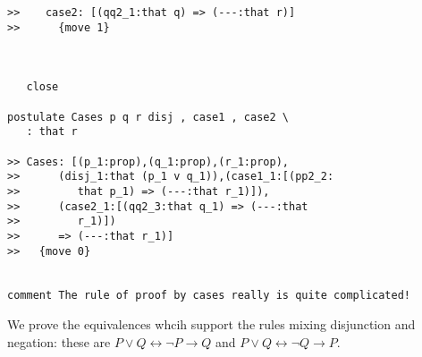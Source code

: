 \documentclass[12pt]{article}
\begin{document}
\begin{verbatim}
>>    case2: [(qq2_1:that q) => (---:that r)]
>>      {move 1}



   close

postulate Cases p q r disj , case1 , case2 \
   : that r

>> Cases: [(p_1:prop),(q_1:prop),(r_1:prop),
>>      (disj_1:that (p_1 v q_1)),(case1_1:[(pp2_2:
>>         that p_1) => (---:that r_1)]),
>>      (case2_1:[(qq2_3:that q_1) => (---:that
>>         r_1)])
>>      => (---:that r_1)]
>>   {move 0}


comment The rule of proof by cases really is quite complicated!

\end{verbatim}

We prove the equivalences whcih support the rules mixing disjunction and negation:  these are $P \vee Q \leftrightarrow \neg P \rightarrow Q$ and $P \vee Q \leftrightarrow \neg Q \rightarrow P$.
\end{document}
